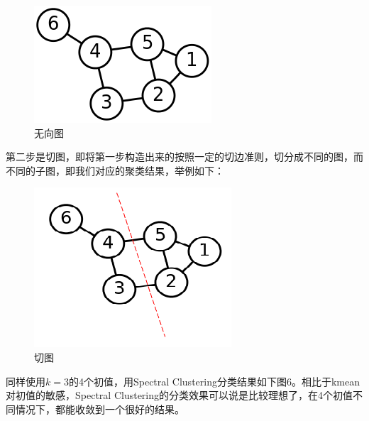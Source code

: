 \documentclass{article}
\newcommand{\hs}{\hspace{2em}}
\begin{document}
\begin{figure}[htbp]
	\centering
	\includegraphics[width=0.3\linewidth]{img//fig8.png}
	\caption{无向图}
\end{figure}
 \hs 第二步是切图，即将第一步构造出来的按照一定的切边准则，切分成不同的图，而不同的子图，即我们对应的聚类结果，举例如下：
 \begin{figure}[htbp]
 	\centering
 	\includegraphics[width=0.3\linewidth]{img//fig9.png}
 	\caption{切图}
 \end{figure} 

 同样使用$k=3$的4个初值，用Spectral Clustering分类结果如下图6。相比于kmean对初值的敏感，Spectral Clustering的分类效果可以说是比较理想了，在4个初值不同情况下，都能收敛到一个很好的结果。
 
\end{document}
